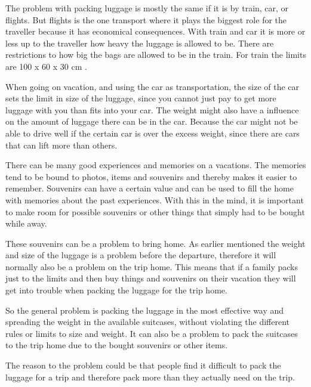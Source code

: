 The problem with packing luggage is mostly the same if it is by train, car, or flights. But flights is the one transport where it plays the biggest role for the traveller because it has economical consequences. With train and car it is more or less up to the traveller how heavy the luggage is allowed to be. There are restrictions to how big the bags are allowed to be in the train. For train the limits are 100 x 60 x 30 cm \citep{rulestrain}.

When going on vacation, and using the car as transportation, the size of the car sets the limit in size of the luggage, since you cannot just pay to get more luggage with you than fits into your car. The weight might also have a influence on the amount of luggage there can be in the car. Because the car might not be able to drive well if the certain car is over the excess weight, since there are cars that can lift more than others. %

There can be many good experiences and memories on a vacations. The memories tend to be bound to photos, items and souvenirs and thereby makes it easier to remember. Souvenirs can have a certain value and can be used to fill the home with memories about the past experiences.
With this in the mind, it is important to make room for possible souvenirs or other things that simply had to be bought while away.

These souvenirs can be a problem to bring home. As earlier mentioned the weight and size of the luggage is a problem before the departure, therefore it will normally also be a problem on the trip home.
This means that if a family packs just to the limits and then buy things and souvenirs on their vacation they will get into trouble when packing the luggage for the trip home.

So the general problem is packing the luggage in the most effective way and spreading the weight in the available suitcases, without violating the different rules or limits to size and weight. It can also be a problem to pack the suitcases to the trip home due to the bought souvenirs or other items.

The reason to the problem could be that people find it difficult to pack the luggage for a trip and therefore pack more than they actually need on the trip.

